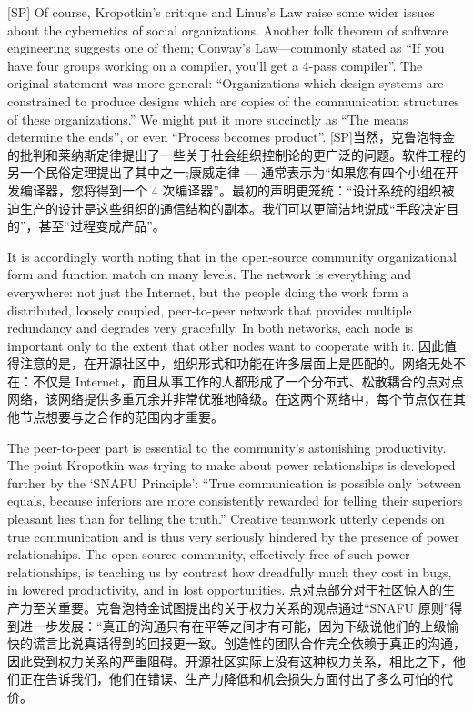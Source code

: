 \documentclass[a4paper,12pt,UTF8,twoside]{ctexbook}
\begin{document}
[SP] Of course, Kropotkin's critique and Linus's Law raise some wider issues about the cybernetics of social organizations. Another folk theorem of software engineering suggests one of them; Conway's Law—commonly stated as ``If you have four groups working on a compiler, you'll get a 4-pass compiler''. The original statement was more general: ``Organizations which design systems are constrained to produce designs which are copies of the communication structures of these organizations.'' We might put it more succinctly as ``The means determine the ends'', or even ``Process becomes product''.
[SP]当然，克鲁泡特金的批判和莱纳斯定律提出了一些关于社会组织控制论的更广泛的问题。软件工程的另一个民俗定理提出了其中之一;康威定律 — 通常表示为“如果您有四个小组在开发编译器，您将得到一个 4 次编译器”。最初的声明更笼统：“设计系统的组织被迫生产的设计是这些组织的通信结构的副本。我们可以更简洁地说成“手段决定目的”，甚至“过程变成产品”。

It is accordingly worth noting that in the open-source community organizational form and function match on many levels. The network is everything and everywhere: not just the Internet, but the people doing the work form a distributed, loosely coupled, peer-to-peer network that provides multiple redundancy and degrades very gracefully. In both networks, each node is important only to the extent that other nodes want to cooperate with it.
因此值得注意的是，在开源社区中，组织形式和功能在许多层面上是匹配的。网络无处不在：不仅是 Internet，而且从事工作的人都形成了一个分布式、松散耦合的点对点网络，该网络提供多重冗余并非常优雅地降级。在这两个网络中，每个节点仅在其他节点想要与之合作的范围内才重要。

The peer-to-peer part is essential to the community's astonishing productivity. The point Kropotkin was trying to make about power relationships is developed further by the `SNAFU Principle': ``True communication is possible only between equals, because inferiors are more consistently rewarded for telling their superiors pleasant lies than for telling the truth.'' Creative teamwork utterly depends on true communication and is thus very seriously hindered by the presence of power relationships. The open-source community, effectively free of such power relationships, is teaching us by contrast how dreadfully much they cost in bugs, in lowered productivity, and in lost opportunities.
点对点部分对于社区惊人的生产力至关重要。克鲁泡特金试图提出的关于权力关系的观点通过“SNAFU 原则”得到进一步发展：“真正的沟通只有在平等之间才有可能，因为下级说他们的上级愉快的谎言比说真话得到的回报更一致。创造性的团队合作完全依赖于真正的沟通，因此受到权力关系的严重阻碍。开源社区实际上没有这种权力关系，相比之下，他们正在告诉我们，他们在错误、生产力降低和机会损失方面付出了多么可怕的代价。
\end{document}
